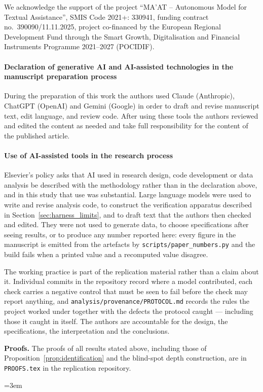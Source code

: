 \documentclass[preprint,11pt,authoryear]{elsarticle}
\newcommand{\1}{\boldsymbol{1}}
\begin{document}
	We acknowledge the support of the project ``MA'AT -- Autonomous
	Model for Textual Assistance'', SMIS Code 2021+: 330941, funding contract no.\ 390090/11.11.2025, project co-financed by the European Regional Development Fund through the Smart Growth, Digitalisation and Financial Instruments Programme 2021--2027 (POCIDIF).

	\paragraph*{Declaration of generative AI and AI-assisted technologies in the manuscript preparation process}
	During the preparation of this work the authors used Claude (Anthropic), ChatGPT (OpenAI) and Gemini (Google) in order to draft and revise manuscript text, edit language, and review code. After using these tools the authors reviewed and edited the content as needed and take full responsibility for the content of the published article.

	\paragraph*{Use of AI-assisted tools in the research process}
	Elsevier's policy asks that AI used in research design, code development or data analysis be described with the methodology rather than in the declaration above, and in this study that use was substantial. Large language models were used to write and revise analysis code, to construct the verification apparatus described in Section~\ref{sec:harness_limits}, and to draft text that the authors then checked and edited. They were not used to generate data, to choose specifications after seeing results, or to produce any number reported here: every figure in the manuscript is emitted from the artefacts by \texttt{scripts/paper\_numbers.py} and the build fails when a printed value and a recomputed value disagree.

	The working practice is part of the replication material rather than a claim about it. Individual commits in the repository record where a model contributed, each check carries a negative control that must be seen to fail before the check may report anything, and \texttt{analysis/provenance/PROTOCOL.md} records the rules the project worked under together with the defects the protocol caught --- including those it caught in itself. The authors are accountable for the design, the specifications, the interpretation and the conclusions.

\medskip\noindent\textbf{Proofs.} The proofs of all results stated above,
including those of Proposition~\ref{prop:identification} and
the blind-spot depth construction, are in \texttt{PROOFS.tex} in the
replication repository.

\sloppy\emergencystretch=3em
	
	
	
	
\newpage
\end{document}
